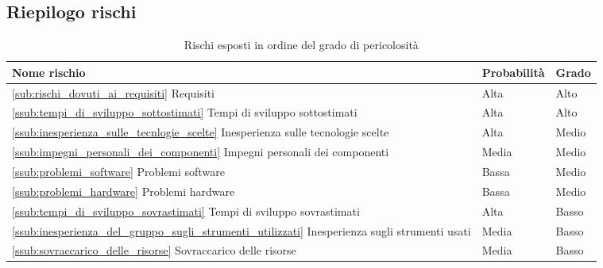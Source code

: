 	\subsection{Riepilogo rischi} %
	\label{sub:riepilogo_rischi}
		\begin{table}[!h]
			\begin{center}
				\begin{tabularx}{0.9\textwidth}{|l|l|X|}
					\hline
					\textbf{Nome rischio} & \textbf{Probabilità} & \textbf{Grado} \\
					\hline
					\ref{sub:rischi_dovuti_ai_requisiti} Requisiti &
					Alta &
					Alto \\
					\hline
					\ref{ssub:tempi_di_sviluppo_sottostimati} Tempi di sviluppo sottostimati &
					Alta &
					Alto \\
					\hline
					
					\ref{ssub:inesperienza_sulle_tecnlogie_scelte} Inesperienza sulle tecnologie scelte &
					Alta &
					Medio \\
					\hline
					\ref{ssub:impegni_personali_dei_componenti} Impegni personali dei componenti &
					Media &
					Medio \\
					\hline
					\ref{ssub:problemi_software} Problemi software &
					Bassa &
					Medio \\
					\hline
					\ref{ssub:problemi_hardware} Problemi hardware &
					Bassa &
					Medio \\
					\hline
					
						
					\ref{ssub:tempi_di_sviluppo_sovrastimati}  Tempi di sviluppo sovrastimati &
					Alta &
					Basso \\
					\hline
					\ref{ssub:inesperienza_del_gruppo_sugli_strumenti_utilizzati} Inesperienza sugli strumenti usati &
					Media &
					Basso \\
					\hline
					\ref{ssub:sovraccarico_delle_risorse} Sovraccarico delle risorse &
					Media &
					Basso \\
					\hline		
				\end{tabularx}
			\end{center}
		\caption{Rischi esposti in ordine del grado di pericolosità}
		\end{table}
		
	
